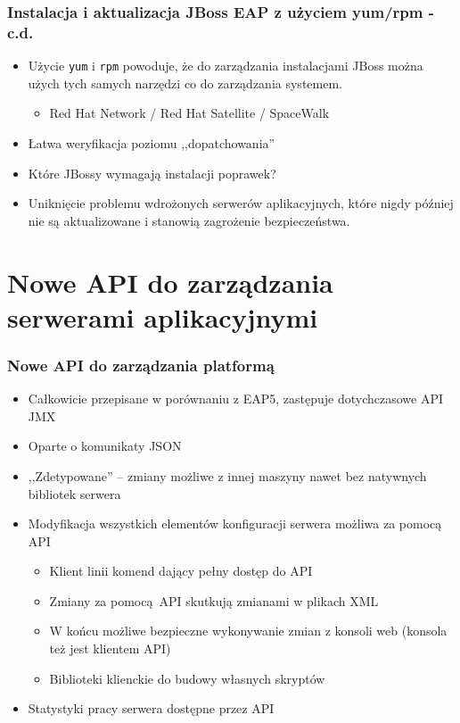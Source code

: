 \documentclass[dvipsnames,table]{beamer}
\begin{document}
\begin{frame}
\frametitle{Instalacja i aktualizacja JBoss EAP z użyciem yum/rpm - c.d.}
\begin{itemize}
	\item Użycie {\tt yum} i {\tt rpm} powoduje, że do zarządzania instalacjami JBoss można użych tych samych narzędzi co do zarządzania systemem.
	\begin{itemize}
		\item Red Hat Network / Red Hat Satellite / SpaceWalk
	\end{itemize}
	\item Łatwa weryfikacja poziomu ,,dopatchowania''
	\item Które JBossy wymagają instalacji poprawek?
	\item Uniknięcie problemu wdrożonych serwerów aplikacyjnych, które nigdy później nie są aktualizowane i stanowią zagrożenie bezpieczeństwa.
\end{itemize}
\end{frame}

\section{Nowe API do zarządzania serwerami aplikacyjnymi}

\begin{frame}
\frametitle{Nowe API do zarządzania platformą}
\begin{itemize}
	\item Całkowicie przepisane w porównaniu z EAP5, zastępuje dotychczasowe API JMX
	\item Oparte o komunikaty JSON
	\item ,,Zdetypowane'' -- zmiany możliwe z innej maszyny nawet bez natywnych bibliotek serwera
	\item Modyfikacja wszystkich elementów konfiguracji serwera możliwa za pomocą API
	\begin{itemize}
		\item Klient linii komend dający pełny dostęp do API
		\item Zmiany za pomocą API skutkują zmianami w plikach XML
		\item W końcu możliwe bezpieczne wykonywanie zmian z konsoli web (konsola też jest klientem API)
		\item Biblioteki klienckie do budowy własnych skryptów
	\end{itemize}
	\item Statystyki pracy serwera dostępne przez API
\end{itemize}
\end{frame}
\end{document}
